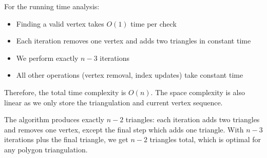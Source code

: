 \documentclass{article}
\begin{document}
    For the running time analysis:
    \begin{itemize}
    \item Finding a valid vertex takes $O(1)$ time per check
    \item Each iteration removes one vertex and adds two triangles in constant time
    \item We perform exactly $n-3$ iterations
    \item All other operations (vertex removal, index updates) take constant time
    \end{itemize}

    Therefore, the total time complexity is $O(n)$. The space complexity is also linear as we only store the triangulation and current vertex sequence.

    The algorithm produces exactly $n-2$ triangles: each iteration adds two triangles and removes one vertex, except the final step which adds one triangle. With $n-3$ iterations plus the final triangle, we get $n-2$ triangles total, which is optimal for any polygon triangulation.

\end{document}
